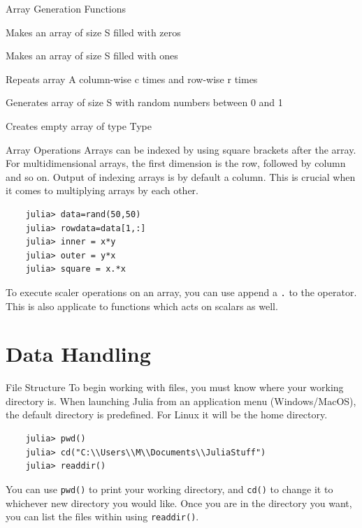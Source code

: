 \documentclass{beamer}
\begin{document}
\begin{frame}[fragile]{Array Generation Functions}
	\begin{description}[leftmargin=*]
		\item[zeros(S)] Makes an array of size S filled with zeros  
		\item[ones(S)]  Makes an array of size S filled with ones 
		\item[repeat(A,c,r)] Repeats array A column-wise c times and row-wise r times
		\item[rand(S)] Generates array of size S with random numbers between 0 and 1
		\item[Type\textbf{[]}] Creates empty array of type Type
	\end{description}
	
\end{frame}

\begin{frame}[fragile]{Array Operations}
	Arrays can be indexed by using square brackets after the array. For multidimensional arrays, the first dimension is the row, followed by column and so on. Output of indexing arrays is by default a column. This is crucial when it comes to multiplying arrays by each other.
	\begin{lstlisting}
	julia> data=rand(50,50)
	julia> rowdata=data[1,:]
	julia> inner = x*y
	julia> outer = y*x
	julia> square = x.*x
	\end{lstlisting}
	To execute scaler operations on an array, you can use append a \verb|.| to the operator. This is also applicate to functions which acts on scalars as well.
\end{frame}

\section{Data Handling}

\begin{frame}[fragile]{File Structure}
	To begin working with files, you must know where your working directory is. When launching Julia from an application menu (Windows/MacOS), the default directory is predefined. For Linux it will be the home directory. 
	\begin{lstlisting}
	julia> pwd()
	julia> cd("C:\\Users\\M\\Documents\\JuliaStuff")
	julia> readdir()
		\end{lstlisting}
	You can use \verb|pwd()| to print your working directory, and \verb|cd()| to change it to whichever new directory you would like.	Once you are in the directory you want, you can list the files within using \verb|readdir()|.
\end{frame}
\end{document}
